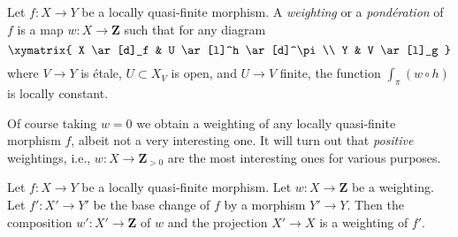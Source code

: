 \begin{definition}
\label{definition-weighting}
Let $f : X \to Y$ be a locally quasi-finite morphism. A
{\it weighting} or a {\it pond\'eration} of $f$ is a map
$w : X \to \mathbf{Z}$ such that for any diagram
$$
\xymatrix{
X \ar[d]_f & U \ar[l]^h \ar[d]^\pi \\
Y & V \ar[l]_g
}
$$
where $V \to Y$ is \'etale, $U \subset X_V$ is open, and $U \to V$ finite,
the function $\int_\pi (w \circ h)$ is locally constant.
\end{definition}

\noindent
Of course taking $w = 0$ we obtain a weighting of any locally quasi-finite
morphism $f$, albeit not a very interesting one. It will turn out that
{\it positive} weightings, i.e., $w : X \to \mathbf{Z}_{> 0}$ are the
most interesting ones for various purposes.

\begin{lemma}
\label{lemma-weighting-base-change}
Let $f : X \to Y$ be a locally quasi-finite morphism.
Let $w : X \to \mathbf{Z}$ be a weighting. Let $f' : X' \to Y'$
be the base change of $f$ by a morphism $Y' \to Y$. Then the
composition $w' : X' \to \mathbf{Z}$ of $w$ and the projection $X' \to X$
is a weighting of $f'$.
\end{lemma}

